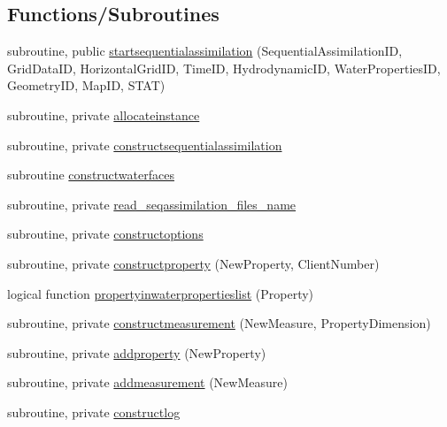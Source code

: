 \subsection*{Functions/\+Subroutines}
\begin{DoxyCompactItemize}
\item 
subroutine, public \mbox{\hyperlink{namespacemodulesequentialassimilation_af7b9f893222a8a590e41b22e1cbb87e8}{startsequentialassimilation}} (Sequential\+Assimilation\+ID, Grid\+Data\+ID, Horizontal\+Grid\+ID, Time\+ID, Hydrodynamic\+ID, Water\+Properties\+ID, Geometry\+ID, Map\+ID, S\+T\+AT)
\item 
subroutine, private \mbox{\hyperlink{namespacemodulesequentialassimilation_aa0f41510375f375c75e2f8a43000247e}{allocateinstance}}
\item 
subroutine, private \mbox{\hyperlink{namespacemodulesequentialassimilation_a3da335c8c675b830ec8be82762a0bb61}{constructsequentialassimilation}}
\item 
subroutine \mbox{\hyperlink{namespacemodulesequentialassimilation_a6a108acb64c98821e2a33f354767a9c1}{constructwaterfaces}}
\item 
subroutine, private \mbox{\hyperlink{namespacemodulesequentialassimilation_ad625646f49c7f79a25eece8ee6fc763c}{read\+\_\+seqassimilation\+\_\+files\+\_\+name}}
\item 
subroutine, private \mbox{\hyperlink{namespacemodulesequentialassimilation_aab4ab0277115cb693a57157090d95c51}{constructoptions}}
\item 
subroutine, private \mbox{\hyperlink{namespacemodulesequentialassimilation_a37aa5f00e0026d3fb403e9d6fd041de3}{constructproperty}} (New\+Property, Client\+Number)
\item 
logical function \mbox{\hyperlink{namespacemodulesequentialassimilation_a8c49e08db24e999a05be06bf048eeb25}{propertyinwaterpropertieslist}} (Property)
\item 
subroutine, private \mbox{\hyperlink{namespacemodulesequentialassimilation_af3fc907b2e8cf5fb7cad188eb652528d}{constructmeasurement}} (New\+Measure, Property\+Dimension)
\item 
subroutine, private \mbox{\hyperlink{namespacemodulesequentialassimilation_a47355d6dd2eb8e4c089b3f5c5170d3d7}{addproperty}} (New\+Property)
\item 
subroutine, private \mbox{\hyperlink{namespacemodulesequentialassimilation_a4263d5378b1943e8de2e1465b38720e8}{addmeasurement}} (New\+Measure)
\item 
subroutine, private \mbox{\hyperlink{namespacemodulesequentialassimilation_a199d6fc518c2a4bb9604a7fdbf0ca4e6}{constructlog}}

\end{DoxyCompactItemize}
